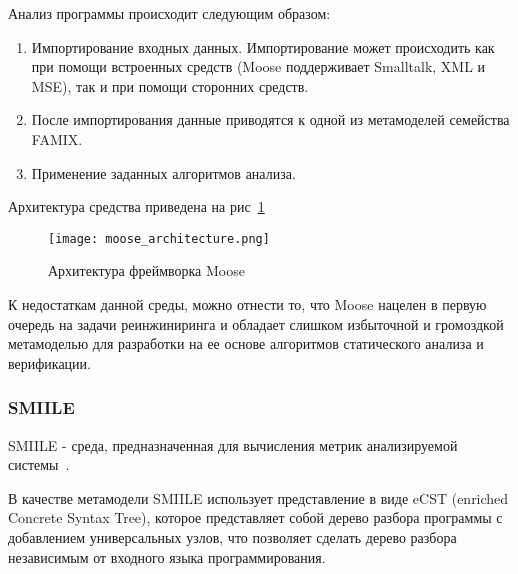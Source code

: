 Анализ программы происходит следующим образом:

\begin{enumerate}
    \item Импортирование входных данных. Импортирование может происходить как
    при помощи встроенных средств (Moose поддерживает Smalltalk, XML и MSE),
    так и при помощи сторонних средств.
    \item После импортирования данные приводятся к одной из метамоделей
    семейства FAMIX.
    \item Применение заданных алгоритмов анализа.
\end{enumerate}

Архитектура средства приведена на рис~\ref{fig:moose_architecture}

\begin{figure}[h]
    \begin{center}
        \texttt{[image: moose\_architecture.png]}
    \end{center}
    \caption{Архитектура фреймворка Moose}
    \label{fig:moose_architecture}
\end{figure}

К недостаткам данной среды, можно отнести то, что Moose нацелен в первую очередь
на задачи реинжиниринга и обладает слишком избыточной и громоздкой метамоделью
для разработки на ее основе алгоритмов статического анализа и верификации.

\subsubsection{SMIILE}



SMIILE - среда, предназначенная для вычисления метрик анализируемой
системы~\cite{smile}.

В качестве метамодели SMIILE использует представление в виде eCST (enriched
Concrete Syntax Tree), которое представляет собой дерево разбора программы с
добавлением универсальных узлов, что позволяет сделать дерево разбора
независимым от входного языка программирования.

